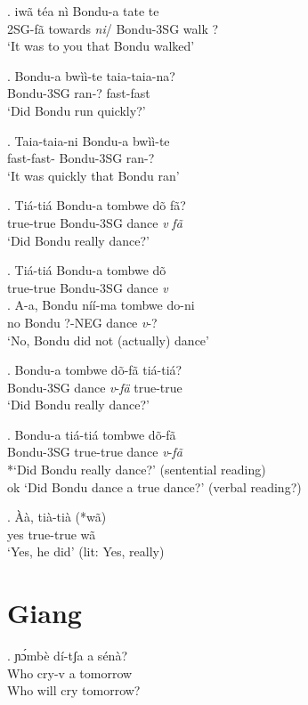 \documentclass{assets/fieldnotes}
\begin{document}
\exg. iwã téa nì Bondu-a tate te\\
2SG-fã towards \textit{ni}/ Bondu-3SG walk ?\\
`It was to you that Bondu walked'

\exg. Bondu-a bwìì-te taia-taia-na?\\
Bondu-3SG ran-? fast-fast\\
`Did Bondu run quickly?'

\exg. Taia-taia-ni Bondu-a bwìì-te\\
fast-fast- Bondu-3SG ran-?\\
`It was quickly that Bondu ran'

\exg. Tiá-tiá Bondu-a tombwe dõ fã?\\
true-true Bondu-3SG dance \textit{v} \textit{fã}\\
`Did Bondu really dance?'

\exg. Tiá-tiá Bondu-a tombwe dõ\\
true-true Bondu-3SG dance \textit{v}\\

\exg. A-a, Bondu níí-ma tombwe do-ni\\
no Bondu ?-NEG dance \textit{v}-?\\
`No, Bondu did not (actually) dance'

\exg. Bondu-a tombwe dõ-fã tiá-tiá?\\
Bondu-3SG dance \textit{v}-\textit{fä} true-true\\
`Did Bondu really dance?'

\exg. Bondu-a tiá-tiá tombwe dõ-fã\\
Bondu-3SG true-true dance \textit{v}-\textit{fã}\\
*`Did Bondu really dance?' (sentential reading)\\
ok `Did Bondu dance a true dance?' (verbal reading?)


\exg. Àà, tià-tià (*wã)\\
yes true-true wã\\
`Yes, he did' (lit: Yes, really)


\section{Giang}
 


\exg. ɲɔ́mbè dí-tʃa a sénà?\\
Who cry-v a tomorrow\\
Who will cry tomorrow?
\end{document}
